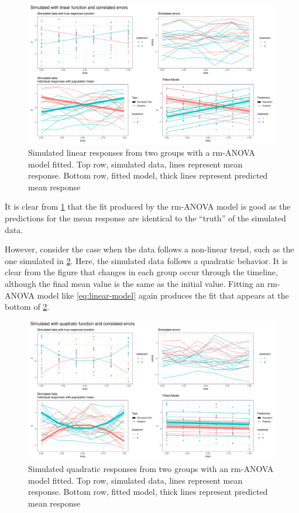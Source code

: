 \documentclass[
]{article}
\begin{document}
\begin{figure}
\includegraphics[width=1\linewidth]{Manuscript_AM_v1_files/figure-latex/linear-model-1} \caption{Simulated linear responses from two groups with a rm-ANOVA model fitted. Top row, simulated data, lines represent mean response. Bottom row, fitted model, thick lines represent predicted mean response }\label{fig:linear-model}
\end{figure}

It is clear from \ref{fig:linear-model} that the fit produced by the rm-ANOVA model is good as the predictions for the mean response are identical to the ``truth'' of the simulated data.

However, consider the case when the data follows a non-linear trend, such as the one simulated in \ref{fig:quadratic-response}. Here, the simulated data follows a quadratic behavior. It is clear from the figure that changes in each group occur through the timeline, although the final mean value is the same as the initial value. Fitting an rm-ANOVA model like \eqref{eq:linear-model} again produces the fit that appears at the bottom of \ref{fig:quadratic-response}.

\begin{figure}
\includegraphics[width=1\linewidth]{Manuscript_AM_v1_files/figure-latex/quadratic-response-1} \caption{Simulated quadratic responses from two groups with an rm-ANOVA model fitted. Top row, simulated data, lines represent mean response. Bottom row, fitted model, thick lines represent predicted mean response}\label{fig:quadratic-response}
\end{figure}
\end{document}
